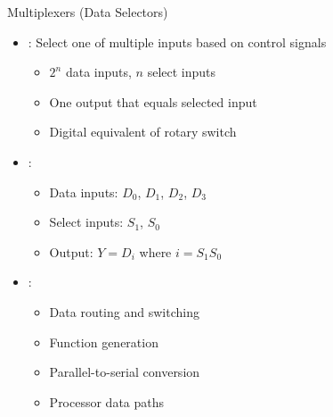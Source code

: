 \begin{frame}{Multiplexers (Data Selectors)}
\begin{itemize}
\item {}: Select one of multiple inputs based on control signals
\begin{itemize}
\item $2^n$ data inputs, $n$ select inputs
\item One output that equals selected input
\item Digital equivalent of rotary switch
\end{itemize}
\vspace{0.5cm}
\item {}:
\begin{itemize}
\item Data inputs: $D_0$, $D_1$, $D_2$, $D_3$
\item Select inputs: $S_1$, $S_0$
\item Output: $Y = D_i$ where $i = S_1S_0$
\end{itemize}
\vspace{0.3cm}
\item {}:
\begin{itemize}
\item Data routing and switching
\item Function generation
\item Parallel-to-serial conversion
\item Processor data paths
\end{itemize}
\end{itemize}
\end{frame}

